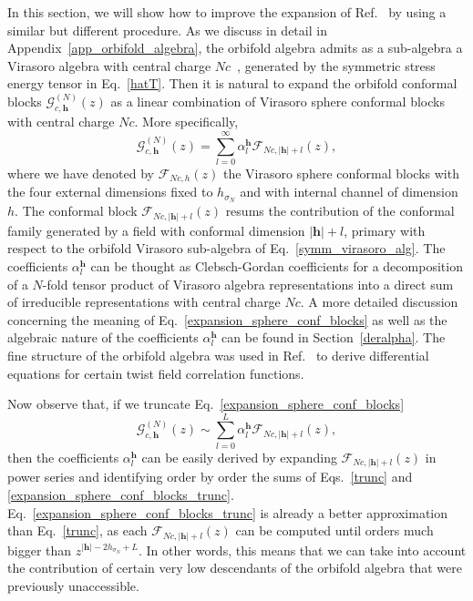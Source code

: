 \documentclass[a4paper,11pt]{article}
\begin{document}
In this section, we will show how to improve the expansion of Ref.~\cite{Collier} by using a similar but different procedure.
As we discuss in detail in Appendix~\ref{app_orbifold_algebra}, the orbifold algebra admits as a sub-algebra a Virasoro algebra with central charge $Nc$~\cite{Borisov}, generated by the symmetric stress energy tensor in Eq.~\eqref{hatT}. Then it is natural to expand the orbifold conformal blocks 
$\mathcal{G}_{c, \boldsymbol{h}}^{(N)}(z)$ as a linear combination of Virasoro sphere conformal blocks with central charge $Nc$. More specifically,
\begin{equation}\label{expansion_sphere_conf_blocks}
 \mathcal{G}_{c, \boldsymbol{h}}^{(N)}(z)=\sum_{l=0}^\infty\alpha_l^{\boldsymbol{h}}\mathcal{F}_{Nc, |\boldsymbol{h}|+l}(z),
\end{equation}
where we have  denoted by $\mathcal{F}_{Nc, h }(z)$ the Virasoro sphere conformal blocks with the four external dimensions fixed to  $h_{\sigma_N}$ and with internal channel of dimension $h$. The conformal block $\mathcal{F}_{Nc, |\boldsymbol{h}|+l}(z)$ resums the 
contribution of the conformal family generated by a field with conformal dimension $|\boldsymbol{h}|+l$, primary with respect to the 
orbifold Virasoro sub-algebra of Eq.~\eqref{symm_virasoro_alg}. The coefficients $\alpha_l^{\boldsymbol{h}}$ can be thought as Clebsch-Gordan coefficients for a 
decomposition of a $N$-fold tensor product of Virasoro algebra representations into a direct sum of irreducible representations with central charge $Nc$. A more detailed discussion concerning the meaning of Eq.~\eqref{expansion_sphere_conf_blocks}  as well as the algebraic nature of the coefficients $\alpha_{l}^{\boldsymbol{h}}$ can be found in Section~\ref{deralpha}. The fine structure of the orbifold algebra was used in Ref.~\cite{Dupic} to derive differential equations for certain twist field correlation functions.

\noindent Now observe that, if we truncate Eq.~\eqref{expansion_sphere_conf_blocks}  
\begin{equation}\label{expansion_sphere_conf_blocks_trunc}
 \mathcal{G}_{c, \boldsymbol{h}}^{(N)}(z)\sim\sum_{l=0}^{L}\alpha_{l}^{\boldsymbol{h}}
 \mathcal{F}_{Nc, |\boldsymbol{h}|+l}(z),
\end{equation}
then the coefficients $\alpha_{l}^{\boldsymbol{h}}$ can be easily derived by expanding $\mathcal{F}_{Nc, |\boldsymbol{h}|+l}(z)$ in power series and identifying order by order the sums of Eqs.~\eqref{trunc} and \eqref{expansion_sphere_conf_blocks_trunc}.
Eq.~\eqref{expansion_sphere_conf_blocks_trunc} is already a better approximation than 
Eq.~\eqref{trunc}, as each  $\mathcal{F}_{Nc, |\boldsymbol{h}|+l}(z)$ can be computed until orders much bigger than $z^{|\boldsymbol{h}|-2h_{\sigma_N}+L}$. In other words, this means that we can take into account the contribution of certain very low descendants of the orbifold algebra that were previously unaccessible.
\end{document}

